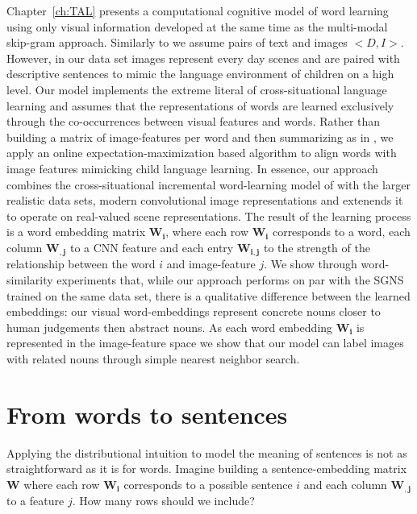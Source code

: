 Chapter~\ref{ch:TAL} presents a computational cognitive model of word learning using only
visual information developed at the same time as the multi-modal skip-gram approach.
Similarly to \cite{feng2010visual} we assume pairs of text and images
$<D, I>$. However, in our data set images represent every day scenes and are paired with descriptive
sentences to mimic the language environment of children on a high level.
Our model implements the extreme literal of cross-situational language
learning and assumes that the representations of words are learned exclusively through the co-occurrences
between visual features and words. Rather than building a
matrix of image-features per word and then summarizing as in \cite{kiela2014learning},
we apply an online expectation-maximization based \citep{dempster1977maximum} 
algorithm to align words with image features mimicking child language learning.
In essence, our approach combines the cross-situational incremental word-learning model
of \cite{fazly.etal.10csj} with the larger realistic data sets, modern convolutional image representations
and extenends it to operate on real-valued scene representations.
The result of the learning process is a word embedding matrix $\mathbf{W_i}$,
where each row $\mathbf{W_i}$ corresponds to a word, each column $\mathbf{W_{,j}}$
to a CNN feature and each entry $\mathbf{W_{i,j}}$ to the strength
of the relationship between the word $i$ and image-feature $j$.
We show through word-similarity experiments that, while our approach performs on
par with the SGNS trained on the same data set, there is a qualitative difference between
the learned embeddings: our visual word-embeddings represent concrete nouns closer to human
judgements then abstract nouns. As each word embedding $\mathbf{W_i}$ is represented in the
image-feature space we show that our model can label images with related nouns through
simple nearest neighbor search.

\section{From words to sentences}
\label{sec:sentences}
Applying the distributional intuition to model the meaning of sentences is not as straightforward
as it is for words.
Imagine building a sentence-embedding matrix $\mathbf{W}$ where each row 
$\mathbf{W_i}$ corresponds to
a possible sentence $i$ and each column $\mathbf{W_{,j}}$ to a feature $j$.
How many rows should we include? 

